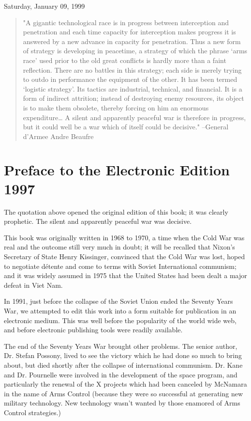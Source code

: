 Saturday, January 09, 1999

\begin{mdframed}[nobreak=true]
\begin{quotation}
"A gigantic technological race is in progress between interception and penetration and each time capacity for interception makes progress it is answered by a new advance in capacity for penetration. Thus a new form of strategy is developing in peacetime, a strategy of which the phrase ‘arms race’ used prior to the old great conflicts is hardly more than a faint reflection.
\newline
There are no battles in this strategy; each side is merely trying to outdo in performance the equipment of the other. It has been termed ‘logistic strategy’. Its tactics are industrial, technical, and financial. It is a form of indirect attrition; instead of destroying enemy resources, its object is to make them obsolete, thereby forcing on him an enormous expenditure…
\newline
A silent and apparently peaceful war is therefore in progress, but it could well be a war which of itself could be decisive."
\newline
--General d’Armee Andre Beaufre
\end{quotation}
\end{mdframed}

\section{Preface to the Electronic Edition 1997}
The quotation above opened the original edition of this book; it was clearly prophetic. The silent and apparently peaceful war was decisive.

This book was originally written in 1968 to 1970, a time when the Cold War was real and the outcome still very much in doubt; it will be recalled that Nixon’s Secretary of State Henry Kissinger, convinced that the Cold War was lost, hoped to negotiate détente and come to terms with Soviet International communism; and it was widely assumed in 1975 that the United States had been dealt a major defeat in Viet Nam.

In 1991, just before the collapse of the Soviet Union ended the Seventy Years War, we attempted to edit this work into a form suitable for publication in an electronic medium. This was well before the popularity of the world wide web, and before electronic publishing tools were readily available.

The end of the Seventy Years War brought other problems. The senior author, Dr. Stefan Possony, lived to see the victory which he had done so much to bring about, but died shortly after the collapse of international communism. Dr. Kane and Dr. Pournelle were involved in the development of the space program, and particularly the renewal of the X projects which had been canceled by McNamara in the name of Arms Control (because they were so successful at generating new military technology. New technology wasn’t wanted by those enamored of Arms Control strategies.)

